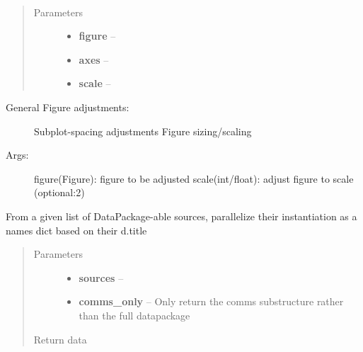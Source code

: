 \documentclass[letterpaper,10pt,english]{sphinxmanual}
\begin{document}
\begin{fulllineitems}
\label{index:bounos.global_adjust}~\begin{quote}\begin{description}
\item[{Parameters}] \leavevmode\begin{itemize}
\item {} 
\textbf{figure} -- 

\item {} 
\textbf{axes} -- 

\item {} 
\textbf{scale} -- 

\end{itemize}

\end{description}\end{quote}
\begin{description}
\item[{General Figure adjustments:}] \leavevmode
Subplot-spacing adjustments
Figure sizing/scaling

\item[{Args:}] \leavevmode
figure(Figure): figure to be adjusted
scale(int/float): adjust figure to scale (optional:2)

\end{description}

\end{fulllineitems}


\begin{fulllineitems}
\label{index:bounos.load_sources}
From a given list of DataPackage-able sources, parallelize their instantiation as a names dict based on their d.title
\begin{quote}\begin{description}
\item[{Parameters}] \leavevmode\begin{itemize}
\item {} 
\textbf{sources} -- 

\item {} 
\textbf{comms\_only} -- Only return the comms substructure rather than the full datapackage

\end{itemize}

\item[{Return data}] \leavevmode
\end{description}\end{quote}

\end{fulllineitems}
\end{document}
